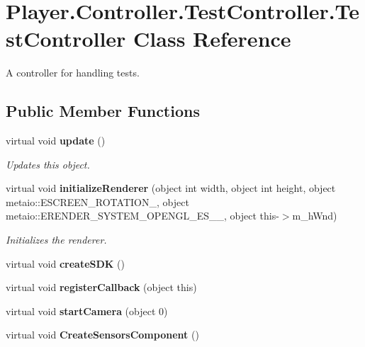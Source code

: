\section{Player.\-Controller.\-Test\-Controller.\-Test\-Controller Class Reference}
\label{class_player_1_1_controller_1_1_test_controller_1_1_test_controller}


A controller for handling tests.  


\subsection*{Public Member Functions}
\begin{DoxyCompactItemize}
\item 
virtual void {\bf update} ()
\begin{DoxyCompactList}\small\item\em Updates this object. \end{DoxyCompactList}\item 
virtual void {\bf initialize\-Renderer} (object int width, object int height, object metaio\-::\-E\-S\-C\-R\-E\-E\-N\-\_\-\-R\-O\-T\-A\-T\-I\-O\-N\-\_, object metaio\-::\-E\-R\-E\-N\-D\-E\-R\-\_\-\-S\-Y\-S\-T\-E\-M\-\_\-\-O\-P\-E\-N\-G\-L\-\_\-\-E\-S\-\_\-\_, object this-\/$>$m\-\_\-h\-Wnd)
\begin{DoxyCompactList}\small\item\em Initializes the renderer. \end{DoxyCompactList}\item 
virtual void {\bfseries create\-S\-D\-K} ()\label{class_player_1_1_controller_1_1_test_controller_1_1_test_controller_aac67031a79ac5a793ab6f959ada4dd68}

\item 
virtual void {\bfseries register\-Callback} (object this)\label{class_player_1_1_controller_1_1_test_controller_1_1_test_controller_aadba2a81ec672dd9482c5842aa9ce259}

\item 
virtual void {\bfseries start\-Camera} (object 0)\label{class_player_1_1_controller_1_1_test_controller_1_1_test_controller_ad62a4ef918a31e035260a1031b242b5d}

\item 
virtual void {\bfseries Create\-Sensors\-Component} ()\label{class_player_1_1_controller_1_1_test_controller_1_1_test_controller_a10417bdaacf6959766e0b58f4a69aabb}


\end{DoxyCompactItemize}
